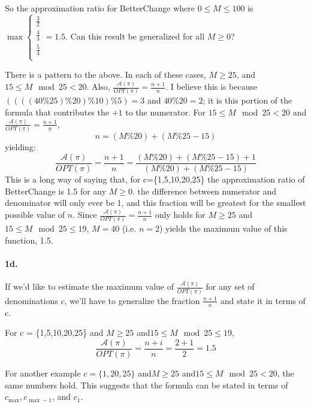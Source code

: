 \documentclass[12pt]{amsart}
\begin{document}
So the approximation ratio for BetterChange where $0 \leq M \leq 100$ is $\max \begin{cases} \frac{3}{2}\\\frac{4}{3}\\\frac{5}{4}\\\end{cases}= 1.5$.  Can this result be generalized for all $M \geq 0$?

There is a pattern to the above.  In each of these cases, $M \geq 25$, and $15 \leq M\mod 25 < 20$.  Also, $\frac{\mathcal{A}(\pi)}{OPT(\pi)}=\frac{n+1}{n}$.  I believe this is because $((((40\% 25)\% 20)\%10)\% 5)=3$ and $40\% 20 = 2$; it is this portion of the formula that contributes the $+1$ to the numerator.  For $15 \leq M\mod 25 < 20$ and $\frac{\mathcal{A}(\pi)}{OPT(\pi)}=\frac{n+1}{n}$, 
\begin{equation*}
n=(M\% 20)+ (M\% 25 -15)
\end{equation*}yielding:
\begin{equation*}
\frac{\mathcal{A}(\pi)}{OPT(\pi)}=\frac{n+1}{n}=\frac{(M\% 20)+ (M\% 25 -15)+1}{(M\% 20) + (M\% 25 -15)}
\end{equation*}
This is a long way of saying that, for c=\{1,5,10,20,25\} the approximation ratio of BetterChange is 1.5 for any $M \geq 0$.  the difference between numerator and denominator will only ever be 1, and this fraction will be greatest for the smallest possible value of $n$.  Since $\frac{\mathcal{A}(\pi)}{OPT(\pi)}=\frac{n+1}{n}$ only holds for $M \geq 25$ and$15 \leq M\mod 25 \leq 19$, $M=40$ (i.e. $n=2$) yields the maximum value of this function, 1.5.\\

\paragraph{1d.}  If we'd like to estimate the maximum value of $\frac{\mathcal{A}(\pi)}{OPT(\pi)}$ for any set of denominations $c$, we'll have to generalize the fraction $\frac{n+1}{n}$ and state it in terms of c.

For c = \{1,5,10,20,25\} and $M \geq 25$ and$15 \leq M\mod 25 \leq 19$,
\begin{displaymath}
\frac{\mathcal{A}(\pi)}{OPT(\pi)}=\frac{n+i}{n}=\frac{2+1}{2}=1.5
\end{displaymath}

For another example $c=\{1,20,25\}$ and$M \geq 25$ and$15 \leq M\mod 25 < 20$, the same numbers hold.  This suggests that the formula can be stated in terms of $c_{\max}, c_{\max-1}$, and $c_1$.  
\end{document}
